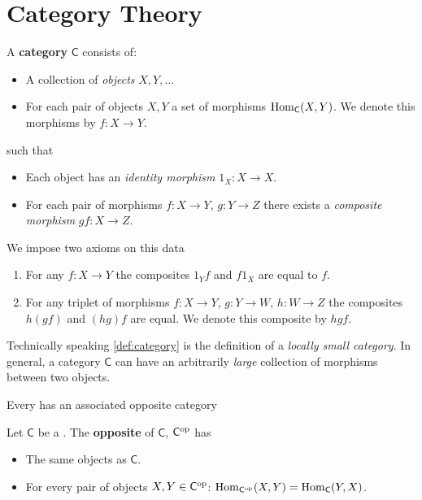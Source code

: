 \documentclass[../main.tex]{subfiles}
\begin{document}
\chapter{Category Theory}
\begin{definition}[Category] \label{def:category}
  A \textbf{category} \(\mathsf{C}\) consists of:
  \begin{itemize}
    \item A collection of \textit{objects} \(X, Y, \ldots\)
    \item For each pair of objects \(X, Y\) a set of morphisms \(\operatorname{Hom}_{\mathsf{C}}(X, Y)\).
          We denote this morphisms by \(f: X \to Y\).
  \end{itemize}
  such that
  \begin{itemize}
    \item Each object has an \textit{identity morphism} \(1_{X}: X \to X\).
    \item For each pair of morphisms \(f: X \to Y\), \(g: Y \to Z\) there exists a \textit{composite morphism} \(gf: X \to Z\).
  \end{itemize}

  We impose two axioms on this data
  \begin{enumerate}
    \item For any \(f: X \to Y\) the composites \(1_{Y}f\) and \(f1_{X}\) are equal to \(f\).
    \item For any triplet of morphisms \(f: X \to Y\), \(g: Y \to W\), \(h: W \to Z\) the composites \(h(gf)\) and \((hg)f\) are equal.
          We denote this composite by \(hgf\).
  \end{enumerate}
\end{definition}

\begin{remark}
  Technically speaking \autoref{def:category} is the definition of a \textit{locally small category}.
  In general, a category \(\mathsf{C}\) can have an arbitrarily \textit{large} collection of morphisms between two objects.
\end{remark}

Every  has an associated opposite category
\begin{definition} \label{def:opposite-category}
  Let \(\mathsf{C}\) be a .
  The \textbf{opposite } of \(\mathsf{C}\), \(\mathsf{C}^{\operatorname*{op}}\) has
  \begin{itemize}
    \item The same objects as \(\mathsf{C}\).
    \item For every pair of objects \(X, Y \in \mathsf{C}^{\operatorname*{op}}\): \(\operatorname{Hom}_{\mathsf{C}^{\operatorname*{op}}}(X, Y) = \operatorname{Hom}_{\mathsf{C}}(Y, X)\).
  \end{itemize}
\end{definition}
\end{document}
